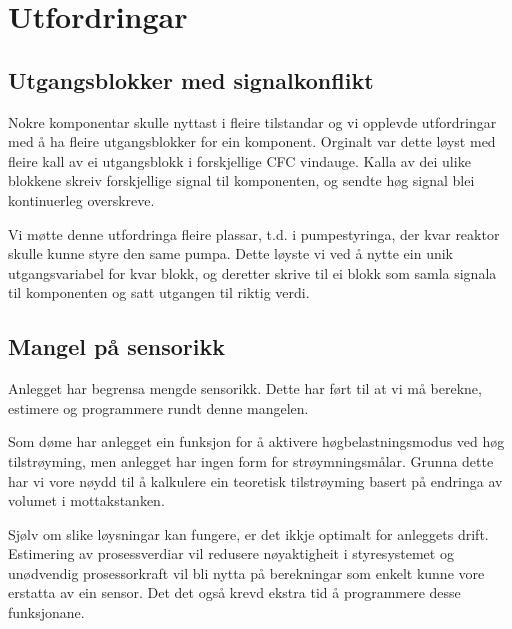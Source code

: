 \section{Utfordringar}
\thispagestyle{fancy}

\subsection{Utgangsblokker med signalkonflikt}
Nokre komponentar skulle nyttast i fleire tilstandar og vi opplevde 
utfordringar med å ha fleire utgangsblokker for ein komponent.
Orginalt var dette løyst med fleire kall av ei utgangsblokk i forskjellige \gls{CFC} vindauge.
Kalla av dei ulike blokkene skreiv forskjellige signal til komponenten, og
sendte høg signal blei kontinuerleg overskreve.

Vi møtte denne utfordringa fleire plassar, t.d. i pumpestyringa,
der kvar reaktor skulle kunne styre den same pumpa.
Dette løyste vi ved å nytte ein unik utgangsvariabel for kvar blokk, 
og deretter skrive til ei blokk som samla signala til komponenten og satt utgangen til riktig verdi.

\subsection{Mangel på sensorikk}

Anlegget har begrensa mengde sensorikk. 
Dette har ført til at vi må berekne, estimere og programmere rundt denne mangelen.

Som døme har anlegget ein funksjon for å aktivere
høgbelastningsmodus ved høg tilstrøyming, 
men anlegget har ingen form for strøymningsmålar.\newline
Grunna dette har vi vore nøydd til å kalkulere ein teoretisk tilstrøyming basert på endringa av volumet i mottakstanken.

Sjølv om slike løysningar kan fungere, er det ikkje optimalt for anleggets drift.
Estimering av prosessverdiar vil redusere nøyaktigheit i styresystemet og
unødvendig prosessorkraft vil bli nytta på berekningar som enkelt kunne vore erstatta av ein sensor.\newline
Det det også krevd ekstra tid å programmere desse funksjonane.


